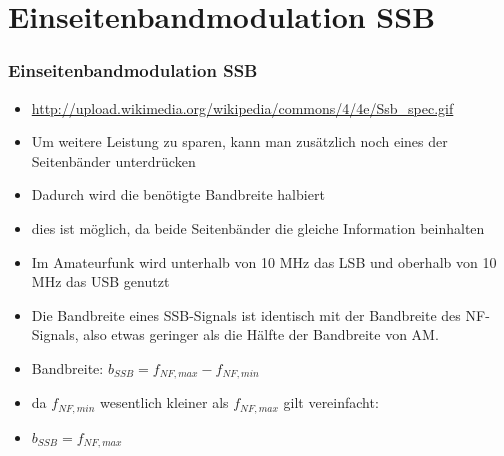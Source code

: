 \section*{Einseitenbandmodulation SSB}
\begin{frame}
\frametitle{Einseitenbandmodulation SSB}
\begin{small}
\begin{itemize}
	\item \url{http://upload.wikimedia.org/wikipedia/commons/4/4e/Ssb_spec.gif}
	\item Um weitere Leistung zu sparen, kann man zusätzlich noch eines der Seitenbänder unterdrücken
	\item Dadurch wird die benötigte Bandbreite halbiert
	\item dies ist möglich, da beide Seitenbänder die gleiche Information beinhalten
	\item Im Amateurfunk wird unterhalb von 10 MHz das LSB und oberhalb von 10 MHz das USB genutzt	
	\item Die Bandbreite eines SSB-Signals ist identisch mit der Bandbreite des NF-Signals, also etwas geringer als die Hälfte der Bandbreite von AM.
	\item Bandbreite: $b_{SSB} = f_{NF,max} - f_{NF,min}$
	\item da $f_{NF,min}$ wesentlich kleiner als $f_{NF,max}$ gilt vereinfacht:
	\item $b_{SSB} = f_{NF,max}$
\end{itemize}
\end{small}
\end{frame}

